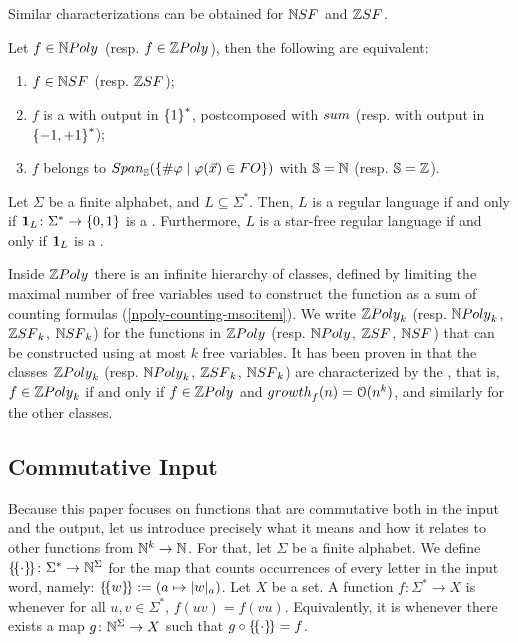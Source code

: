 Similar characterizations can be obtained for $\NSF$ and $\ZSF$.

\begin{lemma}
    Let $f \in \NPoly$ (resp. $f \in \ZPoly$), then
    the following are equivalent:
    \begin{enumerate}
        \item $f \in \NSF$ (resp. $\ZSF$);
        \item $f$ is a  with output
            in $\mathopen{\{} 1 \mathclose{\}}^*$,
            postcomposed with $\polysum$
            (resp. with output in $\mathopen{\{} -1,+1 \mathclose{\}}^*$);
        \item $f$ belongs to
            $\Span{\mathbb{S}}(\setof{\vcount{\varphi}}{\varphi(\vec{x}) \in \FO})$
            with $\mathbb{S} = \mathbb{N}$
            (resp. $\mathbb{S} = \mathbb{Z}$).
    \end{enumerate}
\end{lemma}

\begin{example}
    \label{regular-language:ex}
    Let $\Sigma$ be a finite alphabet, and
    $L \subseteq \Sigma^*$. Then,
    $L$ is a regular language if and only if
    $\mathbf{1}_{L} \colon \Sigma^* \to \mathopen{\{} 0,1 \mathclose{\}}$ is a
    .
    Furthermore, $L$ is a star-free regular language
    if and only if $\mathbf{1}_{L}$ is a
    .
\end{example}


\AP Inside $\ZPoly$ there is an infinite hierarchy of classes, defined by
limiting the maximal number of free variables used to construct the function as
a sum of counting formulas (\cref{npoly-counting-mso:item}). We write
$\ZPoly[k]$ (resp. $\NPoly[k]$, $\ZSF[k]$, $\NSF[k]$) for the functions in
$\ZPoly$ (resp. $\NPoly$, $\ZSF$, $\NSF$) that can be constructed using at most
$k$ free variables. It has been proven in
\cite{LOPEZ23b,bojanczyk2022transducers} that the classes $\ZPoly[k]$ (resp.
$\NPoly[k]$, $\ZSF[k]$, $\NSF[k]$) are characterized by the ,
that is, $f \in \ZPoly[k]$ if and only if $f \in \ZPoly$ and $\growth{f}(n) =
\bigO(n^k)$, and similarly for the other classes.

\subsection{Commutative Input}

\AP Because this paper focuses on functions that are commutative both in the
input and the output, let us introduce precisely what it means and how it
relates to other functions from $\mathbb{N}^k \to \mathbb{N}$. For that, let $\Sigma$ be a
finite alphabet. We define $\commute \colon \Sigma^* \to \Nat^\Sigma$ for the
map that counts occurrences of every letter in the input word, namely: $
\commute[w] \defined (a \mapsto \card[a]{w})$. Let $X$ be a set. A function $f
\colon \Sigma^* \to X$ is  whenever for all $u,v \in
\Sigma^*$, $f(uv) = f(vu)$. Equivalently, it is  whenever
there exists a map $g \colon \mathbb{N}^\Sigma \to X$ such that $g \circ \commute =
f$.

